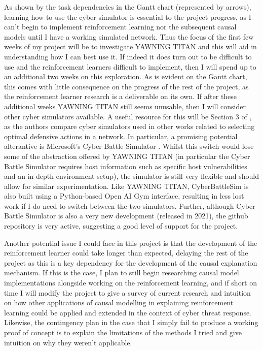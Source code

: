 \documentclass{article}
\begin{document}
As shown by the task dependencies in the Gantt chart (represented by arrows), learning how to use the cyber simulator is essential to the project progress, as I can't begin to implement reinforcement learning nor the subsequent causal models until I have a working simulated network. Thus the focus of the first few weeks of my project will be to investigate YAWNING TITAN and this will aid in understanding how I can best use it. If indeed it does turn out to be difficult to use and the reinforcement learners difficult to implement, then I will spend up to an additional two weeks on this exploration. As is evident on the Gantt chart, this comes with little consequence on the progress of the rest of the project, as the reinforcement learner research is a deliverable on its own. If after these additional weeks YAWNING TITAN still seems unusable,
then I will consider other cyber simulators available. A useful resource for this will be Section 3 of \cite{andrew2022developing}, as the authors compare cyber simulators used in other works related to selecting optimal defensive actions in a network. In particular, a promising potential alterantive is Microsoft's Cyber Battle Simulator \cite{blum2021gamifying}. Whilst this switch would lose some of the abstraction offered by YAWNING TITAN (in particular the Cyber Battle Simulator requires host information
such as specific host vulnerabilities and an in-depth environment
setup), the simulator is still very flexible and should allow for similar experimentation. Like YAWNING TITAN, CyberBattleSim is also built using a Python-based Open AI Gym interface, resulting in less lost work if I do need to switch between the two simulators. Further, although Cyber Battle Simulator is also a very new development (released in 2021), the github repository \cite{msft:cyberbattlesim} is very active, suggesting a good level of support for the project. 


Another potential issue I could face in this project is that the development of the reinforcement learner could take longer than expected, delaying the rest of the project as this is a key dependency for the development of the causal explanation mechanism. If this is the case, I plan to still begin researching causal model implementations alongside working on the reinforcement learning, and if short on time I will modify the project to give a survey of current research and intuition on how other applications of causal modelling in explaining  reinforcement learning could be applied and extended in the context of cyber threat response. Likewise, the contingency plan in the case that I simply fail to produce a working proof of concept is to explain the limitations of the methods I tried and give intuition on why they weren't applicable. 
\end{document}
